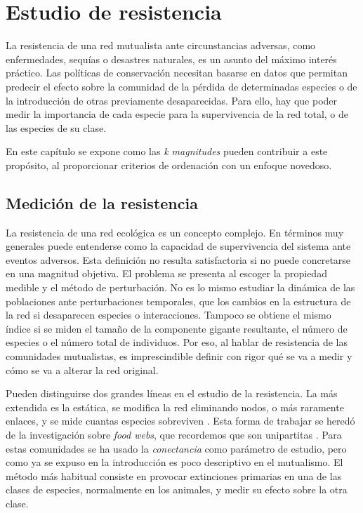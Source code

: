 
\chapter{Estudio de resistencia} %
\label{ChapterDESTRUCCION}  %

La resistencia de una red mutualista ante circunstancias adversas, como enfermedades, sequías o desastres naturales, es un asunto del máximo interés práctico. Las políticas de conservación necesitan basarse en datos que permitan predecir el efecto sobre la comunidad de la pérdida de determinadas especies o de la introducción de otras previamente desaparecidas. Para ello, hay que poder medir la importancia de cada especie para la supervivencia de la red total, o de las especies de su clase.

En este capítulo se expone como las \textit{k magnitudes} pueden contribuir a este propósito, al proporcionar criterios de ordenación con un enfoque novedoso.


\section{Medición de la resistencia}

La resistencia de una red ecológica es un concepto complejo. En términos muy generales puede entenderse como la capacidad de supervivencia del sistema ante eventos adversos. Esta definición no resulta satisfactoria si no puede concretarse en una magnitud objetiva. El problema se presenta al escoger la propiedad medible y el método de perturbación. No es lo mismo estudiar la dinámica de las poblaciones ante perturbaciones temporales, que los cambios en la estructura de la red si desaparecen especies o interacciones. Tampoco se obtiene el mismo índice si se miden el tamaño de la componente gigante resultante, el número de especies o el número total de individuos. Por eso, al hablar de resistencia de las comunidades mutualistas, es imprescindible definir con rigor qué se va a medir y cómo se va a alterar la red original.

Pueden distinguirse dos grandes líneas en el estudio de la resistencia. La más extendida es la estática, se modifica la red eliminando nodos, o más raramente enlaces, y se mide cuantas especies sobreviven \cite{memmott2004tolerance, ebenman2005using, kaiser2010robustness}. Esta forma de trabajar se heredó de la investigación sobre \textit{food webs}, que recordemos que son unipartitas \cite{dunne2002biodiversity, dunne2009cascading}. Para estas comunidades se ha usado la \textit{conectancia} como parámetro de estudio, pero como ya se expuso en la introducción es poco descriptivo en el mutualismo.
El método más habitual consiste en provocar extinciones primarias en una de las clases de especies, normalmente en los animales, y medir su efecto sobre la otra clase.

